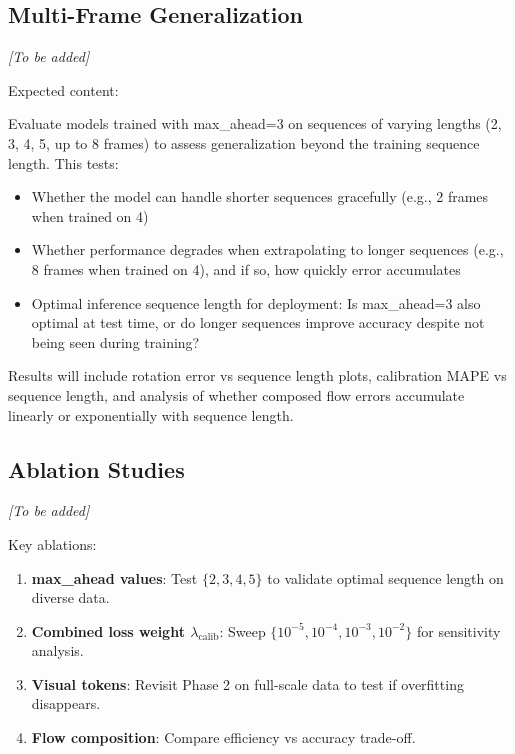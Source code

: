 \subsection{Multi-Frame Generalization}\label{sec:multiframe-generalization}

\emph{[To be added]}

Expected content:

Evaluate models trained with max\_ahead=3 on sequences of varying lengths (2, 3, 4, 5, up to 8 frames) to assess generalization beyond the training sequence length. This tests:
\begin{itemize}
    \item Whether the model can handle shorter sequences gracefully (e.g., 2 frames when trained on 4)
    \item Whether performance degrades when extrapolating to longer sequences (e.g., 8 frames when trained on 4), and if so, how quickly error accumulates
    \item Optimal inference sequence length for deployment: Is max\_ahead=3 also optimal at test time, or do longer sequences improve accuracy despite not being seen during training?
\end{itemize}

Results will include rotation error vs sequence length plots, calibration MAPE vs sequence length, and analysis of whether composed flow errors accumulate linearly or exponentially with sequence length.

\subsection{Ablation Studies}\label{sec:ablations}

\emph{[To be added]}

Key ablations:
\begin{enumerate}
    \item \textbf{max\_ahead values}: Test $\{2, 3, 4, 5\}$ to validate optimal sequence length on diverse data.
    \item \textbf{Combined loss weight $\lambda_{\text{calib}}$}: Sweep $\{10^{-5}, 10^{-4}, 10^{-3}, 10^{-2}\}$ for sensitivity analysis.
    \item \textbf{Visual tokens}: Revisit Phase 2 on full-scale data to test if overfitting disappears.
    \item \textbf{Flow composition}: Compare efficiency vs accuracy trade-off.
\end{enumerate}

